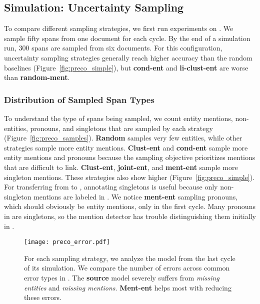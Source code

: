 \subsection{Simulation: Uncertainty Sampling}
\label{ssec:sampling_results}

To compare different sampling
strategies, we first run experiments on \preco{}. We sample fifty spans from one document for each cycle. By the end
of a simulation run, 300 spans are sampled from six documents. For this
configuration, uncertainty sampling strategies generally reach higher accuracy
than the random baselines (Figure~\ref{fig:preco_simple}),
but \textbf{cond-ent} and \textbf{li-clust-ent} are worse than \textbf{random-ment}.

\subsubsection{Distribution of Sampled Span Types}
\label{ssec:distribution}
To understand the type of spans being sampled, we count entity
mentions,
non-entities, pronouns, and singletons that are sampled by each strategy
(Figure~\ref{fig:preco_samples}). \textbf{Random} samples very few
entities, while other strategies sample more entity mentions. \textbf{Clust-ent} and
\textbf{cond-ent} sample more entity mentions and pronouns because the sampling objective
prioritizes mentions that are difficult to link.
\textbf{Clust-ent}, \textbf{joint-ent}, and \textbf{ment-ent} sample more
singleton mentions. These strategies also show higher \avgfone{}
(Figure~\ref{fig:preco_simple}). For transferring from \ontonotes{} to \preco{},
annotating singletons is useful because only non-singleton mentions are labeled
in \ontonotes{}.  We notice \textbf{ment-ent} sampling pronouns, which
should obviously be entity mentions, only in the first cycle.
Many pronouns in \ontonotes{} are singletons, so the mention detector has trouble
distinguishing them initially in \preco{}.


\begin{figure}[!t]
    \centering
    \texttt{[image: preco\_error.pdf]}
    \caption{For each sampling strategy, we analyze the model from the last
    cycle of its \preco{} simulation. We compare the number of errors across common error
    types in \coref{}. The \textbf{source} \ontonotes{} model
    severely suffers from \emph{missing entities} and \emph{missing mentions}.
    \textbf{Ment-ent} helps most with reducing these errors.
    }
    \label{fig:preco_error}
\end{figure}


